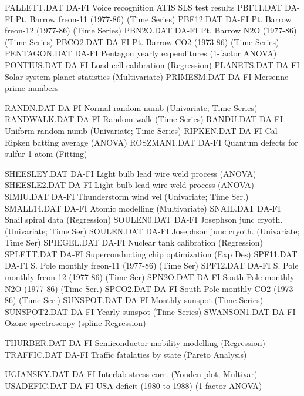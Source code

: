 PALLETT.DAT                 DA-FI Voice recognition ATIS SLS test results
PBF11.DAT                   DA-FI Pt. Barrow freon-11 (1977-86) (Time Series)
PBF12.DAT                   DA-FI Pt. Barrow freon-12 (1977-86) (Time Series)
PBN2O.DAT                   DA-FI Pt. Barrow N2O (1977-86) (Time Series)
PBCO2.DAT                   DA-FI Pt. Barrow CO2 (1973-86) (Time Series)
PENTAGON.DAT                DA-FI Pentagon yearly expenditures (1-factor ANOVA)
PONTIUS.DAT                 DA-FI Load cell calibration (Regression)
PLANETS.DAT                 DA-FI Solar system planet statistics (Multivariate)
PRIMESM.DAT                 DA-FI Mersenne prime numbers

RANDN.DAT                   DA-FI Normal random numb (Univariate; Time Series)
RANDWALK.DAT                DA-FI Random walk (Time Series)
RANDU.DAT                   DA-FI Uniform random numb (Univariate; Time Series)
RIPKEN.DAT                  DA-FI Cal Ripken batting average (ANOVA)
ROSZMAN1.DAT                DA-FI Quantum defects for sulfur 1 atom (Fitting)

SHEESLEY.DAT                DA-FI Light bulb lead wire weld process (ANOVA)
SHEESLE2.DAT                DA-FI Light bulb lead wire weld process (ANOVA)
SIMIU.DAT                   DA-FI Thunderstorm wind vel (Univariate; Time Ser.)
SMALL14.DAT                 DA-FI Atomic modelling (Multivariate)
SNAIL.DAT                   DA-FI Snail spiral data (Regression)
SOULEN0.DAT                 DA-FI Josephson junc cryoth. (Univariate; Time Ser)
SOULEN.DAT                  DA-FI Josephson junc cryoth. (Univariate; Time Ser)
SPIEGEL.DAT                 DA-FI Nuclear tank calibration (Regression)
SPLETT.DAT                  DA-FI Superconducting chip optimization (Exp Des)
SPF11.DAT                   DA-FI S. Pole monthly freon-11 (1977-86) (Time Ser)
SPF12.DAT                   DA-FI S. Pole monthly freon-12 (1977-86) (Time Ser)
SPN2O.DAT                   DA-FI South Pole monthly N2O (1977-86) (Time Ser.)
SPCO2.DAT                   DA-FI South Pole monthly CO2 (1973-86) (Time Ser.)
SUNSPOT.DAT                 DA-FI Monthly sunspot (Time Series)
SUNSPOT2.DAT                DA-FI Yearly sunspot (Time Series)
SWANSON1.DAT                DA-FI Ozone spectroscopy (spline Regression)

THURBER.DAT                 DA-FI Semiconductor mobility modelling (Regression)
TRAFFIC.DAT                 DA-FI Traffic fatalaties by state (Pareto Analysis)

UGIANSKY.DAT                DA-FI Interlab stress corr. (Youden plot; Multivar)
USADEFIC.DAT                DA-FI USA deficit (1980 to 1988) (1-factor ANOVA)

